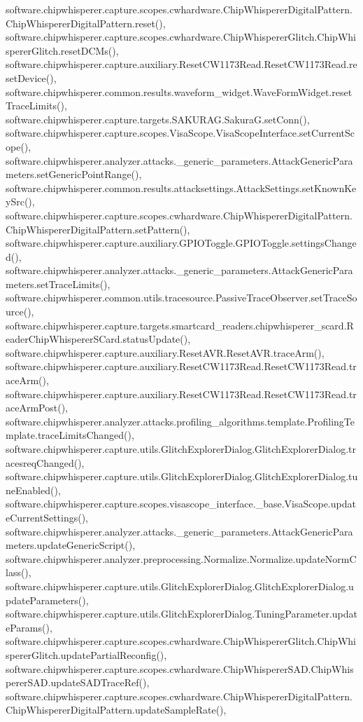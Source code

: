 software.\+chipwhisperer.\+capture.\+scopes.\+cwhardware.\+Chip\+Whisperer\+Digital\+Pattern.\+Chip\+Whisperer\+Digital\+Pattern.\+reset(), software.\+chipwhisperer.\+capture.\+scopes.\+cwhardware.\+Chip\+Whisperer\+Glitch.\+Chip\+Whisperer\+Glitch.\+reset\+D\+C\+Ms(), software.\+chipwhisperer.\+capture.\+auxiliary.\+Reset\+C\+W1173\+Read.\+Reset\+C\+W1173\+Read.\+reset\+Device(), software.\+chipwhisperer.\+common.\+results.\+waveform\+\_\+widget.\+Wave\+Form\+Widget.\+reset\+Trace\+Limits(), software.\+chipwhisperer.\+capture.\+targets.\+S\+A\+K\+U\+R\+A\+G.\+Sakura\+G.\+set\+Conn(), software.\+chipwhisperer.\+capture.\+scopes.\+Visa\+Scope.\+Visa\+Scope\+Interface.\+set\+Current\+Scope(), software.\+chipwhisperer.\+analyzer.\+attacks.\+\_\+generic\+\_\+parameters.\+Attack\+Generic\+Parameters.\+set\+Generic\+Point\+Range(), software.\+chipwhisperer.\+common.\+results.\+attacksettings.\+Attack\+Settings.\+set\+Known\+Key\+Src(), software.\+chipwhisperer.\+capture.\+scopes.\+cwhardware.\+Chip\+Whisperer\+Digital\+Pattern.\+Chip\+Whisperer\+Digital\+Pattern.\+set\+Pattern(), software.\+chipwhisperer.\+capture.\+auxiliary.\+G\+P\+I\+O\+Toggle.\+G\+P\+I\+O\+Toggle.\+settings\+Changed(), software.\+chipwhisperer.\+analyzer.\+attacks.\+\_\+generic\+\_\+parameters.\+Attack\+Generic\+Parameters.\+set\+Trace\+Limits(), software.\+chipwhisperer.\+common.\+utils.\+tracesource.\+Passive\+Trace\+Observer.\+set\+Trace\+Source(), software.\+chipwhisperer.\+capture.\+targets.\+smartcard\+\_\+readers.\+chipwhisperer\+\_\+scard.\+Reader\+Chip\+Whisperer\+S\+Card.\+status\+Update(), software.\+chipwhisperer.\+capture.\+auxiliary.\+Reset\+A\+V\+R.\+Reset\+A\+V\+R.\+trace\+Arm(), software.\+chipwhisperer.\+capture.\+auxiliary.\+Reset\+C\+W1173\+Read.\+Reset\+C\+W1173\+Read.\+trace\+Arm(), software.\+chipwhisperer.\+capture.\+auxiliary.\+Reset\+C\+W1173\+Read.\+Reset\+C\+W1173\+Read.\+trace\+Arm\+Post(), software.\+chipwhisperer.\+analyzer.\+attacks.\+profiling\+\_\+algorithms.\+template.\+Profiling\+Template.\+trace\+Limits\+Changed(), software.\+chipwhisperer.\+capture.\+utils.\+Glitch\+Explorer\+Dialog.\+Glitch\+Explorer\+Dialog.\+tracesreq\+Changed(), software.\+chipwhisperer.\+capture.\+utils.\+Glitch\+Explorer\+Dialog.\+Glitch\+Explorer\+Dialog.\+tune\+Enabled(), software.\+chipwhisperer.\+capture.\+scopes.\+visascope\+\_\+interface.\+\_\+base.\+Visa\+Scope.\+update\+Current\+Settings(), software.\+chipwhisperer.\+analyzer.\+attacks.\+\_\+generic\+\_\+parameters.\+Attack\+Generic\+Parameters.\+update\+Generic\+Script(), software.\+chipwhisperer.\+analyzer.\+preprocessing.\+Normalize.\+Normalize.\+update\+Norm\+Class(), software.\+chipwhisperer.\+capture.\+utils.\+Glitch\+Explorer\+Dialog.\+Glitch\+Explorer\+Dialog.\+update\+Parameters(), software.\+chipwhisperer.\+capture.\+utils.\+Glitch\+Explorer\+Dialog.\+Tuning\+Parameter.\+update\+Params(), software.\+chipwhisperer.\+capture.\+scopes.\+cwhardware.\+Chip\+Whisperer\+Glitch.\+Chip\+Whisperer\+Glitch.\+update\+Partial\+Reconfig(), software.\+chipwhisperer.\+capture.\+scopes.\+cwhardware.\+Chip\+Whisperer\+S\+A\+D.\+Chip\+Whisperer\+S\+A\+D.\+update\+S\+A\+D\+Trace\+Ref(), software.\+chipwhisperer.\+capture.\+scopes.\+cwhardware.\+Chip\+Whisperer\+Digital\+Pattern.\+Chip\+Whisperer\+Digital\+Pattern.\+update\+Sample\+Rate(), 